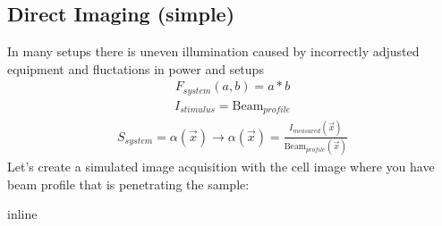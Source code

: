 \documentclass[letterpaper,10pt,english]{sphinxmanual}
\begin{document}
\subsection{Direct Imaging (simple)}
\label{\detokenize{04-BasicSegmentation:direct-imaging-simple}}
\sphinxAtStartPar
In many setups there is un\sphinxhyphen{}even illumination caused by incorrectly adjusted equipment and fluctations in power and setups
\begin{equation*}
\begin{split}F_{system}(a,b)=a*b\end{split}
\end{equation*}\begin{equation*}
\begin{split}I_{stimulus}=\textrm{Beam}_{profile}\end{split}
\end{equation*}\begin{equation*}
\begin{split}S_{system}=\alpha(\vec{x})\longrightarrow\alpha(\vec{x})=\frac{I_{measured}(\vec{x})}{\textrm{Beam}_{profile}(\vec{x})}\end{split}
\end{equation*}
\sphinxAtStartPar
Let’s create a simulated image acquisition with the cell image where you have beam profile that is penetrating the sample:

\begin{sphinxVerbatim}[commandchars=\\\{\}]
 inline
   
   
   
   
   
   
\end{sphinxVerbatim}
\end{document}
